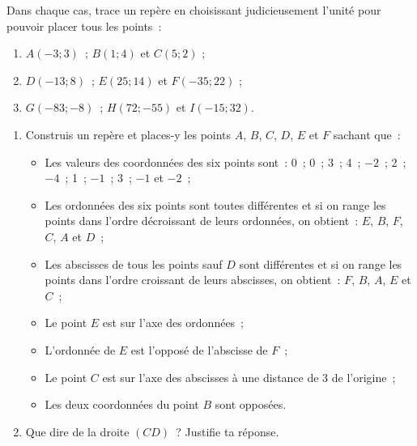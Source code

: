 \begin{exercice}[Repères]
Dans chaque cas, trace un repère en choisissant judicieusement l'unité pour pouvoir placer tous les points :
\begin{enumerate}
 \item $A(- 3 ; 3)$ ; $B(1 ; 4)$ et $C(5 ; 2)$ ; 
 \item $D(- 13 ; 8)$ ; $E(25 ; 14)$ et $F(- 35 ; 22)$ ;
 \item $G(- 83 ; - 8)$ ; $H(72 ; - 55)$ et $I(- 15 ; 32)$.
 \end{enumerate}
\end{exercice}


\begin{exercice}
\begin{enumerate}
 \item Construis un repère et places-y les points $A$, $B$, $C$, $D$, $E$ et $F$ sachant que :
 \begin{itemize}
  \item Les valeurs des coordonnées des six points sont :
0 ; 0 ; 3 ; 4 ; $- 2$ ; 2 ; $- 4$ ; 1 ; $- 1$ ; 3 ; $- 1$ et $- 2$ ;
  \item Les ordonnées des six points sont toutes différentes et si on range les points dans l'ordre décroissant de leurs ordonnées, on obtient : $E$, $B$, $F$, $C$, $A$ et $D$ ;
  \item Les abscisses de tous les points sauf $D$ sont différentes et si on range les points dans l'ordre croissant de leurs abscisses, on obtient : $F$, $B$, $A$, $E$ et $C$ ;
  \item Le point $E$ est sur l'axe des ordonnées ;
  \item L'ordonnée de $E$ est l'opposé de l'abscisse de $F$ ;
  \item Le point $C$ est sur l'axe des abscisses à une distance de 3 de l'origine ;
  \item Les deux coordonnées du point $B$ sont opposées.
  \end{itemize}
 \item Que dire de la droite $(CD)$ ? Justifie ta réponse.
 \end{enumerate}
\end{exercice}



